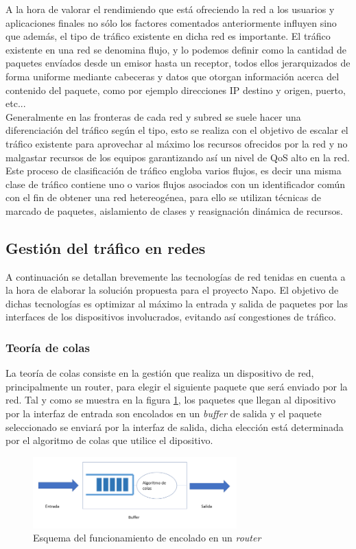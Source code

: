 A la hora de valorar el rendimiendo que está ofreciendo la red a los usuarios y aplicaciones finales no sólo los factores comentados anteriormente influyen sino que además, el tipo de tráfico existente en dicha red es importante. El tráfico existente en una red se denomina flujo, y lo podemos definir como la cantidad de paquetes envíados desde un emisor hasta un receptor, todos ellos jerarquizados de forma uniforme mediante cabeceras y datos que otorgan información acerca del contenido del paquete, como por ejemplo direcciones IP destino y origen, puerto, etc...\\
Generalmente en las fronteras de cada red y subred se suele hacer una diferenciación del tráfico según el tipo, esto se realiza con el objetivo de escalar el tráfico existente para aprovechar al máximo los recursos ofrecidos por la red y no malgastar recursos de los equipos garantizando así un nivel de QoS alto en la red. Este proceso de clasificación de tráfico engloba varios flujos, es decir una misma clase de tráfico contiene uno o varios flujos asociados con un identificador común con el fin de obtener una red hetereogénea, para ello se utilizan técnicas de marcado de paquetes, aislamiento de clases y reasignación dinámica de recursos. 

\subsection{Gestión del tráfico en redes}
	A continuación se detallan brevemente las tecnologías de red tenidas en cuenta a la hora de elaborar la solución propuesta para el proyecto Napo. El objetivo de dichas tecnologías es optimizar al máximo la entrada y salida de paquetes por las interfaces de los dispositivos involucrados, evitando así congestiones de tráfico.
	
	\subsubsection{Teoría de colas}
	La teoría de colas consiste en la gestión que realiza un dispositivo de red, principalmente un router, para elegir el siguiente paquete que será enviado por la red. Tal y como se muestra en la figura \ref{teoriaColas}, los paquetes que llegan al dipositivo por la interfaz de entrada son encolados en un \textit{buffer} de salida y el paquete seleccionado se enviará por la interfaz de salida, dicha elección está determinada por el algoritmo de colas que utilice el dipositivo.
	
	\begin{figure}[H]
			\centering
			\includegraphics[width=0.7\textwidth]{img/teoriaColas.PNG}
			\caption{Esquema del funcionamiento de encolado en un \textit{router}}
			\label{teoriaColas}
		\end{figure}
		
